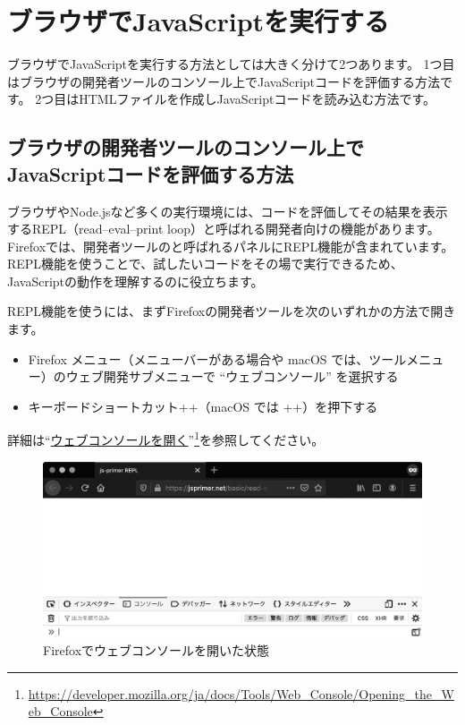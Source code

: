 \hypertarget{execute-js-on-browser}{%
\section{ブラウザでJavaScriptを実行する}\label{execute-js-on-browser}}

ブラウザでJavaScriptを実行する方法としては大きく分けて2つあります。
1つ目はブラウザの開発者ツールのコンソール上でJavaScriptコードを評価する方法です。
2つ目はHTMLファイルを作成しJavaScriptコードを読み込む方法です。

\hypertarget{repl-on-browser}{%
\subsection{ブラウザの開発者ツールのコンソール上でJavaScriptコードを評価する方法}\label{repl-on-browser}}

ブラウザやNode.jsなど多くの実行環境には、コードを評価してその結果を表示するREPL（read--eval--print
loop）と呼ばれる開発者向けの機能があります。
Firefoxでは、開発者ツールの\textbf{}と呼ばれるパネルにREPL機能が含まれています。
REPL機能を使うことで、試したいコードをその場で実行できるため、JavaScriptの動作を理解するのに役立ちます。

REPL機能を使うには、まずFirefoxの開発者ツールを次のいずれかの方法で開きます。

\begin{itemize}
\item
  Firefox メニュー（メニューバーがある場合や macOS
  では、ツールメニュー）のウェブ開発サブメニューで ``ウェブコンソール''
  を選択する
\item
  キーボードショートカット++（macOS では
  ++）を押下する
\end{itemize}

詳細は``\href{https://developer.mozilla.org/ja/docs/Tools/Web_Console/Opening_the_Web_Console}{ウェブコンソールを開く}''\footnote{\url{https://developer.mozilla.org/ja/docs/Tools/Web_Console/Opening_the_Web_Console}}を参照してください。

\begin{figure}[h]
\centering
\includegraphics[width=140mm]{./fig/web-console.eps}
\caption{Firefoxでウェブコンソールを開いた状態}
\end{figure}

